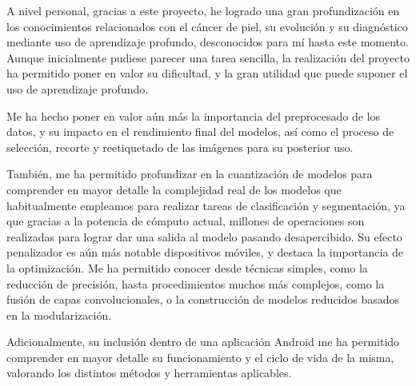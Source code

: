 A nivel personal, gracias a este proyecto, he logrado una gran profundización en los conocimientos relacionados con el cáncer de piel, su evolución y su diagnóstico mediante uso de aprendizaje profundo, desconocidos para mí hasta este momento. Aunque inicialmente pudiese parecer una tarea sencilla, la realización del proyecto ha permitido poner en valor su dificultad, y la gran utilidad que puede suponer el uso de aprendizaje profundo.

Me ha hecho poner en valor aún más la importancia del preprocesado de los datos, y su impacto en el rendimiento final del modelos, así como el proceso de selección, recorte y reetiquetado de las imágenes para su posterior uso.

También, me ha permitido profundizar en la cuantización de modelos para comprender en mayor detalle la complejidad real de los modelos que habitualmente empleamos para realizar tareas de clasificación y segmentación, ya que gracias a  la potencia de cómputo actual, millones de operaciones son realizadas para lograr dar una salida al modelo pasando desapercibido. Su efecto penalizador es aún más notable dispositivos móviles, y destaca la importancia de la optimización. Me ha permitido conocer desde técnicas simples, como la reducción de precisión, hasta procedimientos muchos más complejos, como la fusión de capas convolucionales, o la construcción de modelos reducidos basados en la modularización.

Adicionalmente, su inclusión dentro de una aplicación Android me ha permitido comprender en mayor detalle su funcionamiento y el ciclo de vida de la misma,  valorando los distintos métodos y herramientas aplicables. 


